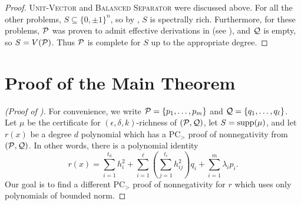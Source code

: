 \begin{proof}
\textsc{Unit-Vector} and \textsc{Balanced Separator} were discussed above. For all the other problems, $S \subseteq \{0,\pm 1\}^n$, so by , $S$ is spectrally rich. Furthermore, for these problems, $\mathcal P$ was proven to admit effective derivations in  (see ), and $\mathcal Q$ is empty, so $S = V(\mathcal P)$. Thus $\mathcal P$ is complete for $S$ up to the appropriate degree. 
\end{proof}

\section{Proof of the Main Theorem}\label{sec:bc_proof_main}
\begin{proof}[(Proof of )]
For convenience, we write $\mathcal P = \{p_1,\dots,p_m\}$ and $\mathcal Q = \{q_1,\dots,q_\ell\}$. Let $\mu$ be the certificate for $(\epsilon,\delta,k)$-richness of $(\mathcal P,\mathcal Q)$, let $S = \operatorname{supp}(\mu)$, and let $r(x)$ be a degree $d$ polynomial which has a PC$_>$ proof of nonnegativity from $(\mathcal P,\mathcal Q)$. In other words, there is a polynomial identity
\[r(x) = \sum_{i=1}^{t_0} h_i^2 + \sum_{i=1}^\ell \left(\sum_{j=1}^{t_i} h_{ij}^2\right) q_i + \sum_{i=1}^m \lambda_i p_i.\]
Our goal is to find a different PC$_>$ proof of nonnegativity for $r$ which uses only polynomials of bounded norm.


\end{proof}
